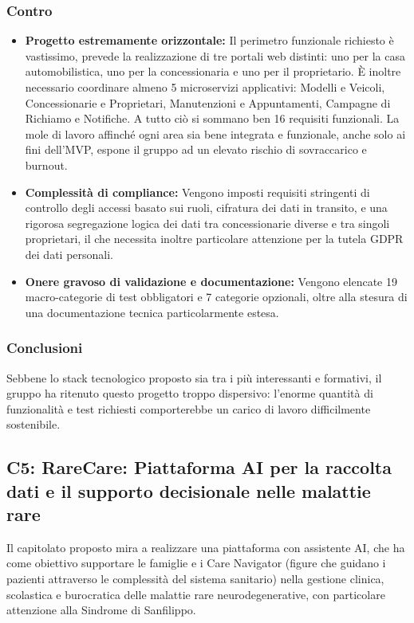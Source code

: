 \subsubsection{Contro}
\begin{itemize}
    \item \textbf{Progetto estremamente orizzontale:} Il perimetro funzionale richiesto è vastissimo, prevede la realizzazione di tre portali web distinti: uno per la casa automobilistica, uno per la concessionaria e uno per il proprietario. È inoltre necessario coordinare almeno 5 microservizi applicativi: Modelli e Veicoli, Concessionarie e Proprietari, Manutenzioni e Appuntamenti, Campagne di Richiamo e Notifiche. A tutto ciò si sommano ben 16 requisiti funzionali. La mole di lavoro affinché ogni area sia bene integrata e funzionale, anche solo ai fini dell'MVP, espone il gruppo ad un elevato rischio di sovraccarico e burnout.
    \item \textbf{Complessità di compliance:} Vengono imposti requisiti stringenti di controllo degli accessi basato sui ruoli, cifratura dei dati in transito, e una rigorosa segregazione logica dei dati tra concessionarie diverse e tra singoli proprietari, il che necessita inoltre particolare attenzione per la tutela GDPR dei dati personali.
    \item \textbf{Onere gravoso di validazione e documentazione:} Vengono elencate 19 macro-categorie di test obbligatori e 7 categorie opzionali, oltre alla stesura di una documentazione tecnica particolarmente estesa.
\end{itemize}

\subsubsection{Conclusioni}
Sebbene lo stack tecnologico proposto sia tra i più interessanti e formativi, il gruppo ha ritenuto questo progetto troppo dispersivo: l'enorme quantità di funzionalità e test richiesti comporterebbe un carico di lavoro difficilmente sostenibile.

\subsection{C5: RareCare: Piattaforma AI per la raccolta dati e il supporto decisionale nelle malattie rare}

Il capitolato proposto mira a realizzare una piattaforma con assistente AI, che ha come obiettivo supportare le famiglie e i Care Navigator (figure che guidano i pazienti attraverso le complessità del sistema sanitario) nella gestione clinica, scolastica e burocratica delle malattie rare neurodegenerative, con particolare attenzione alla Sindrome di Sanfilippo.

